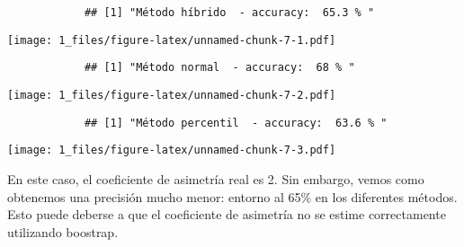 \documentclass[a4paper]{article}
\begin{document}
		\begin{Shaded}
			\begin{Highlighting}[]
				\StringTok{ }\NormalTok{(}\NormalTok{, }\NormalTok{, }\NormalTok{)}
				\NormalTok{(}
				\NormalTok{\}}
			\end{Highlighting}
		\end{Shaded}
		
		\begin{verbatim}
			## [1] "Método híbrido  - accuracy:  65.3 % "
		\end{verbatim}
		
		\texttt{[image: 1\_files/figure-latex/unnamed-chunk-7-1.pdf]}
		
		\begin{verbatim}
			## [1] "Método normal  - accuracy:  68 % "
		\end{verbatim}
		
		\texttt{[image: 1\_files/figure-latex/unnamed-chunk-7-2.pdf]}
		
		\begin{verbatim}
			## [1] "Método percentil  - accuracy:  63.6 % "
		\end{verbatim}
		
		\texttt{[image: 1\_files/figure-latex/unnamed-chunk-7-3.pdf]}
		
		En este caso, el coeficiente de asimetría real es 2. Sin embargo, vemos
		como obtenemos una precisión mucho menor: entorno al 65\% en los
		diferentes métodos. Esto puede deberse a que el coeficiente de asimetría
		no se estime correctamente utilizando boostrap.
\end{document}
